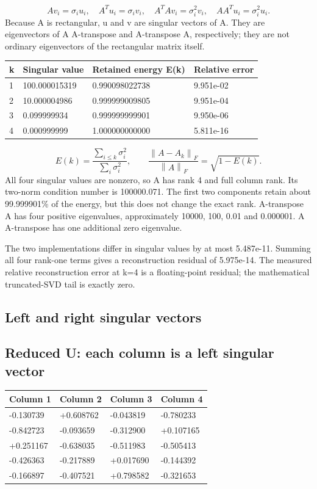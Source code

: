 \documentclass[a4paper,11pt]{article}
\begin{document}
\[Av_i=\sigma_i u_i,\quad A^Tu_i=\sigma_i v_i,\quad A^TAv_i=\sigma_i^2v_i,\quad AA^Tu_i=\sigma_i^2u_i.\]
Because A is rectangular, u and v are singular vectors of A. They are eigenvectors of A A-transpose and A-transpose A, respectively; they are not ordinary eigenvectors of the rectangular matrix itself.

\begin{center}\fontsize{9}{11}\selectfont\begin{tabular}{@{}llll@{}}\toprule
k & Singular value & Retained energy E(k) & Relative error\\\midrule
1 & 100.000015319 & 0.990098022738 & 9.951e-02\\
2 & 10.000004986 & 0.999999009805 & 9.951e-04\\
3 & 0.099999934 & 0.999999999901 & 9.950e-06\\
4 & 0.000999999 & 1.000000000000 & 5.811e-16\\
\bottomrule\end{tabular}\end{center}
\[E(k)=\frac{\sum_{i\le k}\sigma_i^2}{\sum_i\sigma_i^2},\qquad \frac{\left\|A-A_k\right\|_F}{\left\|A\right\|_F}=\sqrt{1-E(k)}.\]
All four singular values are nonzero, so A has rank 4 and full column rank. Its two-norm condition number is 100000.071. The first two components retain about 99.999901\% of the energy, but this does not change the exact rank. A-transpose A has four positive eigenvalues, approximately 10000, 100, 0.01 and 0.000001. A A-transpose has one additional zero eigenvalue.

The two implementations differ in singular values by at most 5.487e-11. Summing all four rank-one terms gives a reconstruction residual of 5.975e-14. The measured relative reconstruction error at k=4 is a floating-point residual; the mathematical truncated-SVD tail is exactly zero.

\subsection*{Left and right singular vectors}
\subsection*{Reduced U: each column is a left singular vector}
\begin{center}\fontsize{8.5}{10.5}\selectfont\begin{tabular}{@{}llll@{}}\toprule
Column 1 & Column 2 & Column 3 & Column 4\\\midrule
-0.130739 & +0.608762 & -0.043819 & -0.780233\\
-0.842723 & -0.093659 & -0.312900 & +0.107165\\
+0.251167 & -0.638035 & -0.511983 & -0.505413\\
-0.426363 & -0.217889 & +0.017690 & -0.144392\\
-0.166897 & -0.407521 & +0.798582 & -0.321653\\
\bottomrule\end{tabular}\end{center}
\end{document}
